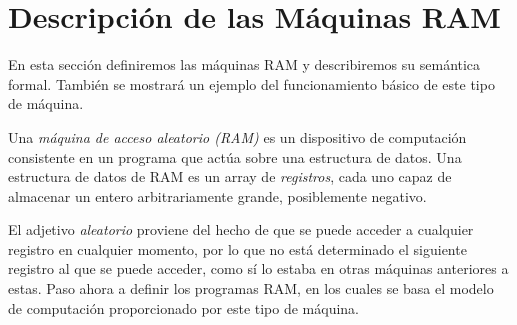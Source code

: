 \documentclass[twoside]{article}
\begin{document}
\tableofcontents

\newpage

\section{Descripción de las Máquinas RAM}

En esta sección definiremos las máquinas RAM y describiremos su semántica formal. También se mostrará un ejemplo del funcionamiento básico de este tipo de máquina.

\begin{defi}
Una \emph{máquina de acceso aleatorio (RAM)} es un dispositivo de computación consistente en un programa que actúa sobre una estructura de datos. Una estructura de datos de RAM es un array de \emph{registros}, cada uno capaz de almacenar un entero arbitrariamente grande, posiblemente negativo.
\end{defi}

El adjetivo \emph{aleatorio} proviene del hecho de que se puede acceder a cualquier registro en cualquier momento, por lo que no está determinado el siguiente registro al que se puede acceder, como sí lo estaba en otras máquinas anteriores a estas. Paso ahora a definir los programas RAM, en los cuales se basa el modelo de computación proporcionado por este tipo de máquina.
\end{document}
